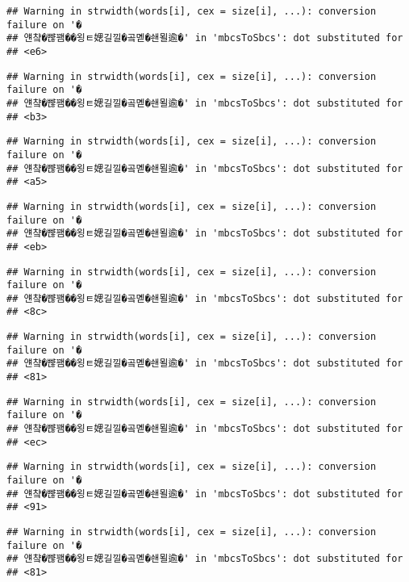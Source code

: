 \documentclass[]{article}
\begin{document}
\begin{verbatim}
## Warning in strwidth(words[i], cex = size[i], ...): conversion failure on '�
## 얜챸�뺞꽴��욍ㅌ媤길낄�곸몓�쇈묄逾�' in 'mbcsToSbcs': dot substituted for
## <e6>
\end{verbatim}

\begin{verbatim}
## Warning in strwidth(words[i], cex = size[i], ...): conversion failure on '�
## 얜챸�뺞꽴��욍ㅌ媤길낄�곸몓�쇈묄逾�' in 'mbcsToSbcs': dot substituted for
## <b3>
\end{verbatim}

\begin{verbatim}
## Warning in strwidth(words[i], cex = size[i], ...): conversion failure on '�
## 얜챸�뺞꽴��욍ㅌ媤길낄�곸몓�쇈묄逾�' in 'mbcsToSbcs': dot substituted for
## <a5>
\end{verbatim}

\begin{verbatim}
## Warning in strwidth(words[i], cex = size[i], ...): conversion failure on '�
## 얜챸�뺞꽴��욍ㅌ媤길낄�곸몓�쇈묄逾�' in 'mbcsToSbcs': dot substituted for
## <eb>
\end{verbatim}

\begin{verbatim}
## Warning in strwidth(words[i], cex = size[i], ...): conversion failure on '�
## 얜챸�뺞꽴��욍ㅌ媤길낄�곸몓�쇈묄逾�' in 'mbcsToSbcs': dot substituted for
## <8c>
\end{verbatim}

\begin{verbatim}
## Warning in strwidth(words[i], cex = size[i], ...): conversion failure on '�
## 얜챸�뺞꽴��욍ㅌ媤길낄�곸몓�쇈묄逾�' in 'mbcsToSbcs': dot substituted for
## <81>
\end{verbatim}

\begin{verbatim}
## Warning in strwidth(words[i], cex = size[i], ...): conversion failure on '�
## 얜챸�뺞꽴��욍ㅌ媤길낄�곸몓�쇈묄逾�' in 'mbcsToSbcs': dot substituted for
## <ec>
\end{verbatim}

\begin{verbatim}
## Warning in strwidth(words[i], cex = size[i], ...): conversion failure on '�
## 얜챸�뺞꽴��욍ㅌ媤길낄�곸몓�쇈묄逾�' in 'mbcsToSbcs': dot substituted for
## <91>
\end{verbatim}

\begin{verbatim}
## Warning in strwidth(words[i], cex = size[i], ...): conversion failure on '�
## 얜챸�뺞꽴��욍ㅌ媤길낄�곸몓�쇈묄逾�' in 'mbcsToSbcs': dot substituted for
## <81>
\end{verbatim}
\end{document}
